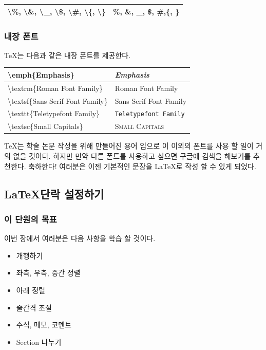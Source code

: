 \documentclass[12pt]{article}
\begin{document}
	\begin{tabularx}{\textwidth \onehalfspacing}{|X|X|}
		\hline
		\textbackslash \%, \textbackslash \&, \textbackslash \_, \textbackslash \$, \textbackslash \#, \textbackslash \{, \textbackslash\} & \%, \&, \_, \$, \#,\{, \}\\
		\hline
	\end{tabularx}
	\clearpage
	\subsubsection{내장 폰트}
	\TeX 는 다음과 같은 내장 폰트를 제공한다.\newline
	
	\begin{tabularx}{\textwidth\onehalfspacing}{|X|X|}
		\hline
		\textbackslash emph\{Emphasis\}&\emph{Emphasis}\\
		\hline
		\textbackslash textrm\{Roman Font Family\}&\textrm{Roman Font Family}\\
		\hline
		\textbackslash textsf\{Sans Serif Font Family\}&\textsf{Sans Serif Font Family}\\
		\hline
		\textbackslash texttt\{Teletypefont Family\}&\texttt{Teletypefont Family}\\
		\hline
		\textbackslash textsc\{Small Capitals\}& \textsc{Small Capitals}\\
		\hline
	\end{tabularx}\newline\newline
	\TeX 는 학술 논문 작성을 위해 만들어진 용어 임으로 이 이외의 폰트를 사용 할 일이 거의 없을 것이다. 하지만 만약 다른 폰트를 사용하고 싶으면 구글에 검색을 해보기를 추천한다.
	\vfill 축하한다! 여러분은 이젠 기본적인 문장을 \LaTeX 로 작성 할 수 있게 되었다.
	\clearpage
	
	\subsection{\LaTeX 단락 설정하기}
	\subsubsection{이 단원의 목표}
	이번 장에서 여러분은 다음 사항을 학습 할 것이다.
	\begin{itemize}
		\item 개행하기
		\item 좌측, 우측, 중간 정렬
		\item 아래 정렬
		\item 줄간격 조절
		\item 주석, 메모, 코멘트
		\item Section 나누기
	\end{itemize} 
\end{document}
